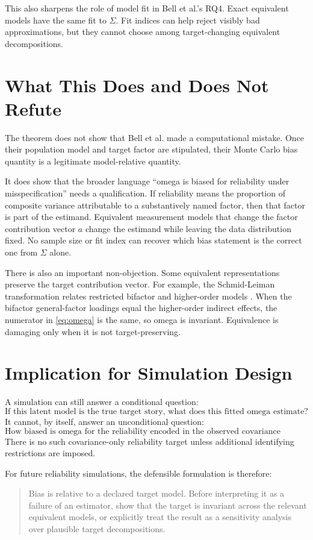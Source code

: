 \documentclass[11pt]{article}
\theoremstyle{plain}
\theoremstyle{remark}
\begin{document}
This also sharpens the role of model fit in Bell et al.'s RQ4. Exact equivalent
models have the same fit to \(\Sigma\). Fit indices can help reject visibly bad
approximations, but they cannot choose among target-changing equivalent
decompositions.

\section{What This Does and Does Not Refute}

The theorem does not show that Bell et al. made a computational mistake. Once
their population model and target factor are stipulated, their Monte Carlo bias
quantity is a legitimate model-relative quantity.

It does show that the broader language ``omega is biased for reliability under
misspecification'' needs a qualification. If reliability means the proportion of
composite variance attributable to a substantively named factor, then that
factor is part of the estimand. Equivalent measurement models that change the
factor contribution vector \(a\) change the estimand while leaving the data
distribution fixed. No sample size or fit index can recover which bias statement
is the correct one from \(\Sigma\) alone.

There is also an important non-objection. Some equivalent representations
preserve the target contribution vector. For example, the Schmid-Leiman
transformation relates restricted bifactor and higher-order models
\cite{schmid1957,yung1999}. When the bifactor general-factor loadings equal the
higher-order indirect effects, the numerator in \eqref{eq:omega} is the same,
so omega is invariant. Equivalence is damaging only when it is not
target-preserving.

\section{Implication for Simulation Design}

A simulation can still answer a conditional question:
\[
  \text{If this latent model is the true target story, what does this fitted
  omega estimate?}
\]
It cannot, by itself, answer an unconditional question:
\[
  \text{How biased is omega for the reliability encoded in the observed
  covariance matrix?}
\]
There is no such covariance-only reliability target unless additional
identifying restrictions are imposed.

For future reliability simulations, the defensible formulation is therefore:
\begin{quote}
  Bias is relative to a declared target model. Before interpreting it as a
  failure of an estimator, show that the target is invariant across the relevant
  equivalent models, or explicitly treat the result as a sensitivity analysis
  over plausible target decompositions.
\end{quote}
\end{document}
